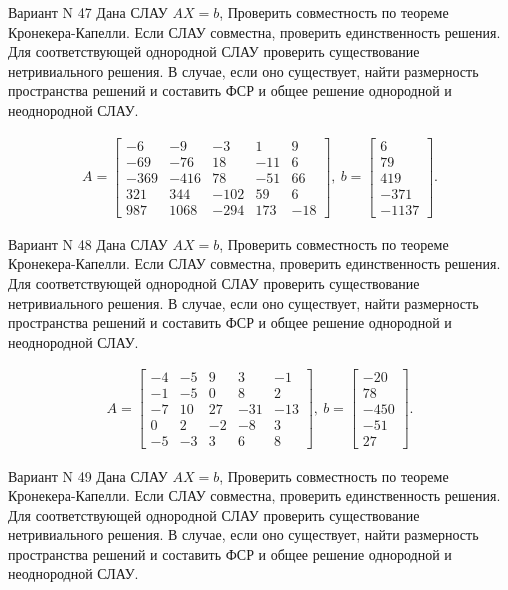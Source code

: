 \documentclass[11pt]{report}
\begin{document}
Вариант N 47
Дана СЛАУ $AX = b$,
Проверить совместность по теореме Кронекера-Капелли. Если СЛАУ совместна, проверить единственность решения.
Для соответствующей однородной СЛАУ проверить существование нетривиального решения. В случае, если оно существует,
найти размерность пространства решений и составить ФСР и общее решение однородной  и неоднородной СЛАУ.


\begin{align*}
 A = \left[\begin{matrix}-6 & -9 & -3 & 1 & 9\\-69 & -76 & 18 & -11 & 6\\-369 & -416 & 78 & -51 & 66\\321 & 344 & -102 & 59 & 6\\987 & 1068 & -294 & 173 & -18\end{matrix}\right],
\ b = \left[\begin{matrix}6\\79\\419\\-371\\-1137\end{matrix}\right]. 
 \end{align*}

Вариант N 48
Дана СЛАУ $AX = b$,
Проверить совместность по теореме Кронекера-Капелли. Если СЛАУ совместна, проверить единственность решения.
Для соответствующей однородной СЛАУ проверить существование нетривиального решения. В случае, если оно существует,
найти размерность пространства решений и составить ФСР и общее решение однородной  и неоднородной СЛАУ.


\begin{align*}
 A = \left[\begin{matrix}-4 & -5 & 9 & 3 & -1\\-1 & -5 & 0 & 8 & 2\\-7 & 10 & 27 & -31 & -13\\0 & 2 & -2 & -8 & 3\\-5 & -3 & 3 & 6 & 8\end{matrix}\right],
\ b = \left[\begin{matrix}-20\\78\\-450\\-51\\27\end{matrix}\right]. 
 \end{align*}

Вариант N 49
Дана СЛАУ $AX = b$,
Проверить совместность по теореме Кронекера-Капелли. Если СЛАУ совместна, проверить единственность решения.
Для соответствующей однородной СЛАУ проверить существование нетривиального решения. В случае, если оно существует,
найти размерность пространства решений и составить ФСР и общее решение однородной  и неоднородной СЛАУ.
\end{document}
